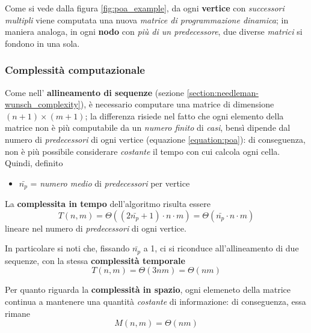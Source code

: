     \vspace{20pt}
    Come si vede dalla figura \ref{fig:poa_example}, da ogni \textbf{vertice} con \emph{successori multipli} viene computata una nuova \emph{matrice di programmazione dinamica}; in maniera analoga, in ogni \textbf{nodo} con \emph{più di un predecessore}, due diverse \emph{matrici} si fondono in una sola.  

\subsubsection{Complessità computazionale}
\label{section:poa-complexity}
    Come nell' \textbf{allineamento di sequenze} (sezione \ref{section:needleman-wunsch_complexity}), è necessario computare una matrice di dimensione $(n + 1) \times (m+1)$; la differenza risiede nel fatto che ogni elemento della matrice non è più computabile da un \emph{numero finito} di \emph{casi}, bensì dipende dal numero di \emph{predecessori} di ogni vertice (equazione \ref{equation:poa}): di conseguenza, non è più possibile considerare \emph{costante} il tempo con cui calcola ogni cella. Quindi, definito
    \begin{itemize}
        \item $\bar{n_p}$ = \emph{numero medio} di \emph{predecessori} per vertice
    \end{itemize}
    La \textbf{complessita in tempo} dell'algoritmo risulta essere
    \begin{equation*}
        T(n, m) = \Theta((2\bar{n_p} + 1) \cdot n \cdot m) = \Theta(\bar{n_p} \cdot n \cdot m)
    \end{equation*}
    lineare nel numero di \emph{predecessori} di ogni vertice.
    
    In particolare si noti che, fissando $\bar{n_p}$ a 1, ci si riconduce all'allineamento di due sequenze, con la stessa \textbf{complessità temporale}
    \begin{equation*}
        T(n, m) = \Theta(3 n m) = \Theta(n m)
    \end{equation*}

    Per quanto riguarda la \textbf{complessità in spazio}, ogni elemeneto della matrice continua a mantenere una quantità \emph{costante} di informazione: di conseguenza, essa rimane
    \begin{equation*}
        M(n, m) = \Theta(n m)
    \end{equation*}
    
